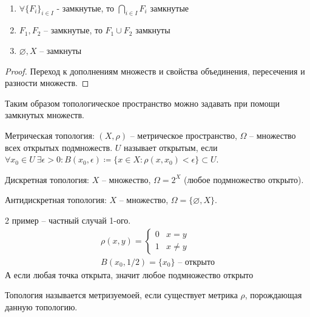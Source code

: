 \documentclass[main]{subfiles}
\begin{document}
\begin{theorem}
    \

    \begin{enumerate}
        \item $\forall \{F_i\}_{i \in I}$ - замкнутые, то $\bigcap_{i\in I} F_i$ замкнутые
        \item $F_1, F_2$ -- замкнутые, то $F_1 \cup F_2$ замкнуты
        \item $\varnothing, X$ -- замкнуты
    \end{enumerate}
\end{theorem}
\begin{proof}
    Переход к дополнениям множеств и свойства объединения, пересечения и разности множеств.
\end{proof}

Таким образом топологическое пространство можно задавать при помощи замкнутых множеств.

\begin{example}
    Метрическая топология:  $(X, \rho)$ -- метрическое пространство, $\Omega$ -- множество всех открытых подмножеств.
    $U$ называет открытым, если $\forall x_0 \in U\ \exists \epsilon > 0: B(x_0, \epsilon) \coloneqq \{x \in X : \rho(x, x_0) < \epsilon\} \subset U$.
\end{example}

\begin{example}
    Дискретная топология: $X$ -- множество, $\Omega= 2^X$ (любое подмножество открыто).
\end{example}

\begin{example}
    Антидискретная топология: $X$ -- множество, $\Omega = \{ \varnothing, X\}$.
\end{example}

\begin{remark}
    2 пример -- частный случай 1-ого.
    \begin{gather*}
        \rho(x,y)  = \begin{cases}
            0 & x = y    \\
            1 & x \neq y
        \end{cases}\\
        B(x_0, 1/2) = \{x_0\} \text{ -- открыто}
    \end{gather*}
    А если любая точка открыта, значит любое подмножество открыто
\end{remark}

\begin{definition}
    Топология называется метризуемоей, если существует метрика $\rho$, порождающая
    данную топологию.
\end{definition}
\end{document}
